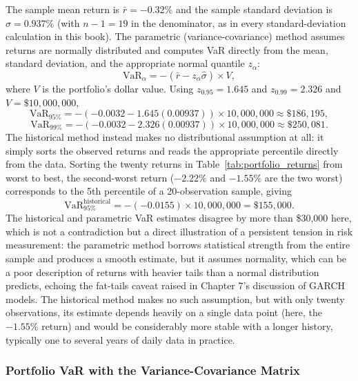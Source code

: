 \documentclass[../ai_in_finance]{subfiles}
\begin{document}
The sample mean return is $\bar r = -0.32\%$ and the sample standard deviation is $\hat\sigma = 0.937\%$ (with $n-1=19$ in the denominator, as in every standard-deviation calculation in this book). The parametric (variance-covariance) method assumes returns are normally distributed and computes VaR directly from the mean, standard deviation, and the appropriate normal quantile $z_\alpha$:
\begin{equation*}
\text{VaR}_\alpha = -(\bar r - z_\alpha \hat\sigma) \times V,
\end{equation*}
where $V$ is the portfolio's dollar value. Using $z_{0.95}=1.645$ and $z_{0.99}=2.326$ and $V=\$10{,}000{,}000$,
\begin{equation*}
\text{VaR}_{95\%} = -(-0.0032 - 1.645(0.00937)) \times 10{,}000{,}000 \approx \$186{,}195,
\end{equation*}
\begin{equation*}
\text{VaR}_{99\%} = -(-0.0032 - 2.326(0.00937)) \times 10{,}000{,}000 \approx \$250{,}081.
\end{equation*}
The historical method instead makes no distributional assumption at all: it simply sorts the observed returns and reads the appropriate percentile directly from the data. Sorting the twenty returns in Table~\ref{tab:portfolio_returns} from worst to best, the second-worst return ($-2.22\%$ and $-1.55\%$ are the two worst) corresponds to the 5th percentile of a 20-observation sample, giving
\begin{equation*}
\text{VaR}_{95\%}^{\text{historical}} = -(-0.0155) \times 10{,}000{,}000 = \$155{,}000.
\end{equation*}
The historical and parametric VaR estimates disagree by more than \$30,000 here, which is not a contradiction but a direct illustration of a persistent tension in risk measurement: the parametric method borrows statistical strength from the entire sample and produces a smooth estimate, but it assumes normality, which can be a poor description of returns with heavier tails than a normal distribution predicts, echoing the fat-tails caveat raised in Chapter 7's discussion of GARCH models. The historical method makes no such assumption, but with only twenty observations, its estimate depends heavily on a single data point (here, the $-1.55\%$ return) and would be considerably more stable with a longer history, typically one to several years of daily data in practice.

\subsubsection*{Portfolio VaR with the Variance-Covariance Matrix}
\label{sec:matrix-var}
\end{document}
